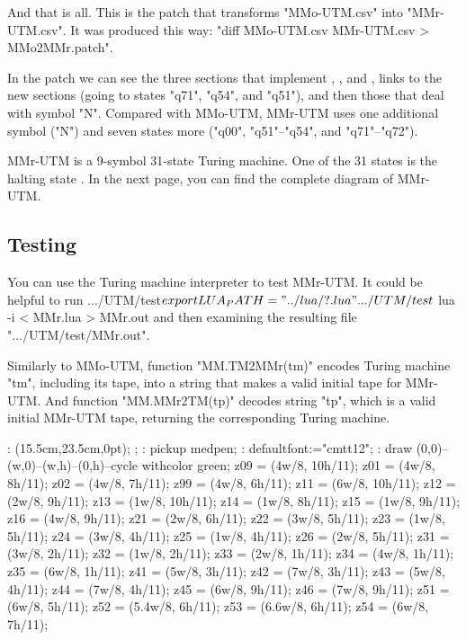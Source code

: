 And that is all.
This is the patch that
 transforms "MMo-UTM.csv" into "MMr-UTM.csv".
It was produced this way: "diff MMo-UTM.csv MMr-UTM.csv > MMo2MMr.patch".
\doublecolumns
{}
\singlecolumn

In the patch we can see the three sections that implement
, ,
 and ,
links to the new sections
 (going to states "q71", "q54", and "q51"),
and then those that deal with symbol "N".
Compared with MMo-UTM, MMr-UTM uses one additional symbol ("N")
and seven states more ("q00", "q51"--"q54", and "q71"--"q72").

MMr-UTM is a 9-symbol 31-state Turing machine.
One of the 31 states is the halting state .
In the next page, you can find the complete diagram of MMr-UTM.


\subsection{Testing}

You can use the Turing machine interpreter to test MMr-UTM.
It could be helpful to run
\begincode
.../UTM/test$ export LUA_PATH="../lua/?.lua"
.../UTM/test$ lua -i < MMr.lua > MMr.out
\endcode
and then examining the resulting file ".../UTM/test/MMr.out".

Similarly to MMo-UTM, function "MM.TM2MMr(tm)" encodes
Turing machine "tm", including its tape,
into a string that makes a valid initial tape for MMr-UTM.
And function "MM.MMr2TM(tp)" decodes string "tp",
which is a valid initial MMr-UTM tape,
returning the corresponding Turing machine.


\vfill\break

\MT:
\MTbeginfig(15.5cm,23.5cm,0pt); %
\MTresetpa;
\MT: pickup medpen;
\MT: defaultfont:="cmtt12";
\MT: draw (0,0)--(w,0)--(w,h)--(0,h)--cycle withcolor green;
\MTcode
 z09 = (4w/8, 10h/11);
 z01 = (4w/8, 8h/11);
 z02 = (4w/8, 7h/11);
 z99 = (4w/8, 6h/11);
 z11 = (6w/8, 10h/11);
 z12 = (2w/8, 9h/11);
 z13 = (1w/8, 10h/11);
 z14 = (1w/8, 8h/11);
 z15 = (1w/8, 9h/11);
 z16 = (4w/8, 9h/11);
 z21 = (2w/8, 6h/11);
 z22 = (3w/8, 5h/11);
 z23 = (1w/8, 5h/11);
 z24 = (3w/8, 4h/11);
 z25 = (1w/8, 4h/11);
 z26 = (2w/8, 5h/11);
 z31 = (3w/8, 2h/11);
 z32 = (1w/8, 2h/11);
 z33 = (2w/8, 1h/11);
 z34 = (4w/8, 1h/11);
 z35 = (6w/8, 1h/11);
 z41 = (5w/8, 3h/11);
 z42 = (7w/8, 3h/11);
 z43 = (5w/8, 4h/11);
 z44 = (7w/8, 4h/11);
 z45 = (6w/8, 9h/11);
 z46 = (7w/8, 9h/11);
 z51 = (6w/8, 5h/11);
 z52 = (5.4w/8, 6h/11);
 z53 = (6.6w/8, 6h/11);
 z54 = (6w/8, 7h/11);

